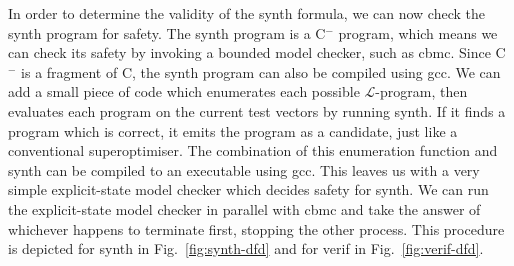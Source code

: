 \documentclass[a4paper]{llncs}
\newcommand{\newC}{C$^-$\xspace}
\begin{document}
In order to determine the validity of the {\sc synth} formula, we can now
check the {\sc synth} program for safety.  The {\sc synth} program is a
\newC program, which means we can check its safety by invoking a bounded
model checker, such as {\sc cbmc}.  Since \newC is a fragment of C,
the {\sc synth} program can also be compiled using {\sc gcc}.
We can add a small piece of code which enumerates each possible
$\mathcal{L}$-program, then evaluates each program on the current test vectors by
running {\sc synth}. If it finds a program which is correct, it emits
the program as a candidate, just like a conventional superoptimiser.
The combination of this enumeration function and {\sc synth} can be compiled
to an executable using {\sc gcc}.  This leaves
us with a very simple explicit-state model checker which decides
safety for {\sc synth}.  We can run the explicit-state model checker
in parallel with {\sc cbmc} and take the answer of whichever happens
to terminate first, stopping the other process.  This procedure is
depicted for {\sc synth} in Fig.~\ref{fig:synth-dfd} and for
{\sc verif} in Fig.~\ref{fig:verif-dfd}.
\end{document}
